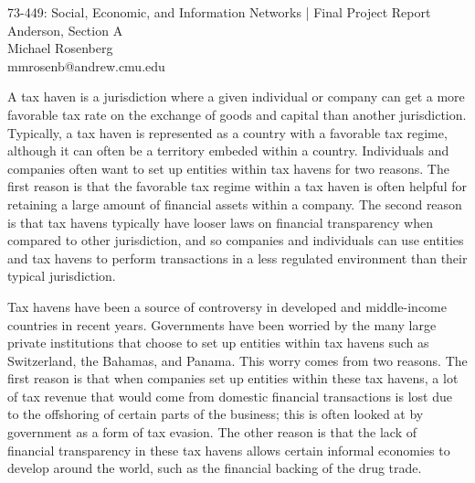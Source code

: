 \documentclass[11pt]{article}
\makeatletter
\newcommand{\myname}{Michael Rosenberg}
\newcommand{\myandrew}{mmrosenb@andrew.cmu.edu}
\newcommand{\mycourse}{73-449: Social, Economic, and Information Networks}
\newcommand{\myhwname}{| Final Project Report}
\newcommand{\myrecitation}{Anderson, Section A}
\newcommand{\myteammates}{}
\makeatother
\begin{document}
\begin{center}
    {\Large \mycourse} {\Large \myhwname} \\
    \myrecitation \\
    \myname \\
    \myandrew \\
\end{center}

A tax haven is a jurisdiction where a given individual or company can get a
more favorable tax rate on the exchange of goods and capital than another
jurisdiction. Typically, a tax haven is represented as a country with a
favorable tax regime, although it can often be a territory embeded within a
country. Individuals and companies often want to set up entities within tax
havens for two reasons. The first reason is that the favorable tax regime within
a tax haven is often helpful for retaining a large amount of financial assets
within a company. The second reason is that tax havens typically have looser
laws on financial transparency when compared to other jurisdiction, and so
companies and individuals can use entities and tax havens to perform
transactions in a less regulated environment than their typical jurisdiction.

Tax havens have been a source of controversy in developed and middle-income
countries in recent years. Governments have been worried by the many large
private institutions that choose to set up entities within tax havens such as
Switzerland, the Bahamas, and Panama. This worry comes from two reasons. The
first reason is that when companies set up entities within these tax havens, a
lot of tax revenue that would come from domestic financial transactions is lost
due to the offshoring of certain parts of the business; this is often looked at
by government as a form of tax evasion. The other reason is that the lack of
financial transparency in these tax havens allows certain informal economies to
develop around the world, such as the financial backing of the drug trade.
\end{document}
